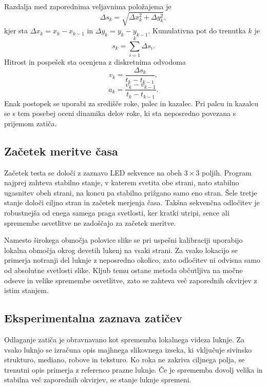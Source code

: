 \documentclass[journal,a4paper,twoside]{sty/IEEEtran}
\begin{document}
Razdalja med zaporednima veljavnima položajema je
\begin{equation}
    \Delta s_k = \sqrt{\Delta x_k^2+\Delta y_k^2},
\label{eq:step}
\end{equation}
kjer sta $\Delta x_k=x_k-x_{k-1}$ in $\Delta y_k=y_k-y_{k-1}$.
Kumulativna pot do trenutka $k$ je
\begin{equation}
    s_k=\sum_{i=1}^{k} \Delta s_i.
    \label{eq:path}
\end{equation}
Hitrost in pospešek sta ocenjena z diskretnima odvodoma
\begin{equation}
    v_k=\frac{\Delta s_k}{t_k-t_{k-1}},
    \label{eq:speed}
\end{equation}
\begin{equation}
    a_k=\frac{v_k-v_{k-1}}{t_k-t_{k-1}}.
    \label{eq:acceleration}
\end{equation}
Enak postopek se uporabi za središče roke, palec in kazalec. Pri palcu in kazalcu se s tem posebej oceni dinamika delov roke, ki sta neposredno povezana s prijemom zatiča.

\subsection{Začetek meritve časa}

Začetek testa se določi z zaznavo LED sekvence na obeh $3 \times 3$ poljih. Program najprej zahteva stabilno stanje, v katerem svetita obe strani, nato stabilno ugasnitev obeh strani, na koncu pa stabilno prižgano samo eno stran. Šele tretje stanje določi ciljno stran in začetek merjenja časa. Takšna sekvenčna odločitev je robustnejša od enega samega praga svetlosti, ker kratki utripi, sence ali spremembe osvetlitve ne zadoščajo za začetek meritve.

Namesto širokega območja polovice slike se pri uspešni kalibraciji uporabijo lokalna območja okrog devetih lukenj na vsaki strani. Za vsako lokacijo se primerja notranji del luknje z neposredno okolico, zato odločitev ni odvisna samo od absolutne svetlosti slike. Kljub temu ostane metoda občutljiva na močne odseve in velike spremembe osvetlitve, zato se zahteva več zaporednih okvirjev z istim stanjem.

\subsection{Eksperimentalna zaznava zatičev}

Odlaganje zatiča je obravnavano kot sprememba lokalnega videza luknje. Za vsako luknjo se izračuna opis majhnega slikovnega izseka, ki vključuje sivinsko strukturo, mediano, robove in teksturo. Ko roka ne zakriva ciljnega polja, se trenutni opis primerja z referenco prazne luknje. Če je sprememba dovolj velika in stabilna več zaporednih okvirjev, se stanje luknje spremeni.
\end{document}
